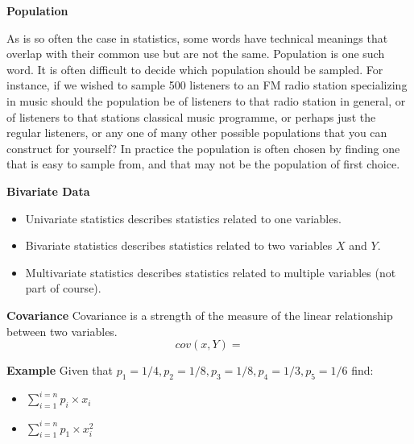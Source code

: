 

\textbf{Population}

As is so often the case in statistics, some words have technical
meanings that overlap with their common use but are not the same.
Population is one such word. It is often difficult to decide
which population should be sampled. For instance, if we wished to
sample 500 listeners to an FM radio station specializing in music
should the population be of listeners to that radio station in
general, or of listeners to that stations classical music
programme, or perhaps just the regular listeners, or any one of
many other possible populations that you can construct for
yourself? In practice the population is often chosen by finding
one that is easy to sample from, and that may not be the
population of first choice.



\noindent \textbf{Bivariate Data}
\begin{itemize}
	\item Univariate statistics describes statistics related to one variables.
	\item Bivariate statistics describes statistics related to two variables $X$ and $Y$.
	\item Multivariate statistics describes statistics related to multiple variables (not part of course).
\end{itemize}


%

\noindent \textbf{Covariance}
Covariance is a strength of the measure of the linear relationship between two variables.
\[ cov(x,Y) = \]



\noindent \textbf{Example}
Given that $p_1= 1/4, p_2= 1/8, p_3= 1/8,p_4= 1/3, p_5 = 1/6$ find:

\begin{itemize}
	\item $\displaystyle\sum_{i=1}^{i=n} p_{i} \times x_{i}$
	\item $\displaystyle\sum_{i=1}^{i=n} p_{1} \times x_{i}^2$
\end{itemize}



